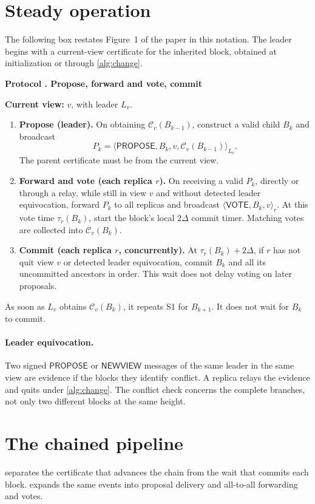 \documentclass[11pt,a4paper]{article}
\newcommand{\QC}{\mathcal C}
\newcommand{\tagg}[1]{\ensuremath{\mathsf{#1}}}
\newcommand{\signed}[2]{\langle #1\rangle_{#2}}
\newcounter{protocol}
\newenvironment{protocol}[2]{\refstepcounter{protocol}\label{#1}
\begin{mdframed}[nobreak=true,linewidth=.6pt,skipabove=8pt,skipbelow=8pt,
innertopmargin=7pt,innerbottommargin=7pt]\small
\textbf{Protocol \theprotocol. #2}\par\smallskip}{\end{mdframed}}
\begin{document}
\section{Steady operation}
\label{sec:steady}
The following box restates Figure~1 of the paper in this notation.
The leader begins with a current-view certificate for the inherited
block, obtained at initialization or through \cref{alg:change}.

\begin{protocol}{alg:steady}{Propose, forward and vote, commit}
\textbf{Current view:} $v$, with leader $L_v$.
\begin{enumerate}[label=\textbf{S\arabic*.},itemsep=4pt]
\item \textbf{Propose (leader).} On obtaining $\QC_v(B_{k-1})$,
construct a valid child $B_k$ and broadcast
\[
 P_k=\signed{\tagg{PROPOSE},B_k,v,\QC_v(B_{k-1})}{L_v}.
\]
The parent certificate must be from the current view.

\item \textbf{Forward and vote (each replica $r$).} On receiving a
valid $P_k$, directly or through a relay, while still in view $v$ and
without detected leader equivocation, forward $P_k$ to all replicas
and broadcast $\signed{\tagg{VOTE},B_k,v}{r}$. At this vote time
$\tau_r(B_k)$, start the block's local $2\Delta$ commit timer.
Matching votes are collected into $\QC_v(B_k)$.

\item \textbf{Commit (each replica $r$, concurrently).} At
$\tau_r(B_k)+2\Delta$, if $r$ has not quit view $v$ or detected leader
equivocation, commit $B_k$ and all its uncommitted ancestors in order.
This wait does not delay voting on later proposals.
\end{enumerate}
As soon as $L_v$ obtains $\QC_v(B_k)$, it repeats S1 for $B_{k+1}$.
It does not wait for $B_k$ to commit.
\end{protocol}

\paragraph{Leader equivocation.}
Two signed \tagg{PROPOSE} or \tagg{NEWVIEW} messages of the same
leader in the same view are evidence if the blocks they identify
conflict. A replica relays the evidence and quits under
\cref{alg:change}. The conflict check concerns the complete branches,
not only two different blocks at the same height.

\section{The chained pipeline}
\label{sec:pipeline}
 separates the certificate that advances the chain
from the wait that commits each block.  expands
the same events into proposal delivery and all-to-all forwarding and votes.
\end{document}
